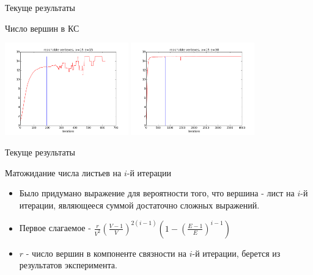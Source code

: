 \documentclass{beamer}
\begin{document}
\begin{frame}{Текуще результаты}
\begin{block}{Число вершин в КС}
\begin{center}
\includegraphics*[height=4cm]{pic/reachable_vertexes_v15e15.png}
\includegraphics*[height=4cm]{pic/reachable_vertexes_v15e30.png}
\end{center}
\end{block}
\end{frame}

\begin{frame}{Текуще результаты}
\begin{block}{Матожидание числа листьев на $i$-й итерации}
\begin{itemize}
 \item Было придумано выражение для вероятности того, что вершина - лист на $i$-й итерации, являющееся суммой достаточно сложных выражений.
 \item Первое слагаемое - $\frac{r}{V^2}\left(\frac{V - 1}{V} \right)^{2(i-1)}\left( 1 - \left(\frac{E - 1}{E} \right)^{i - 1} \right)$
 \item $r$  - число вершин в компоненте связности на $i$-й итерации, берется из результатов эксперимента.
\end{itemize}
\end{block}
\end{frame}
\end{document}
